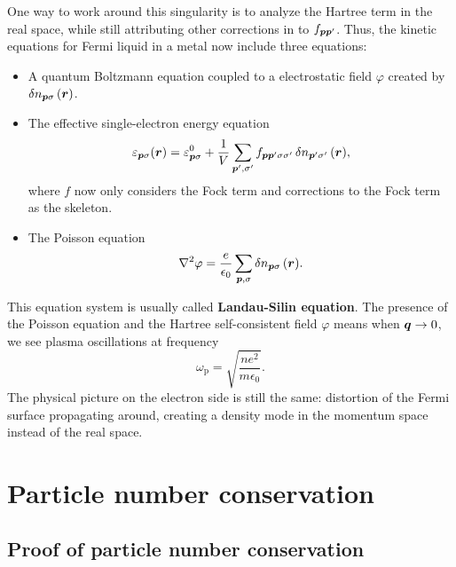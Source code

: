 \documentclass[hyperref, a4paper]{article}
\newcommand*{\concept}[1]{{\textbf{#1}}}
\begin{document}
One way to work around this singularity 
is to analyze the Hartree term in the real space, 
while still attributing other corrections in 
to $f_{\vb*{p} \vb*{p}'}$.
Thus, the kinetic equations for Fermi liquid in a metal 
now include three equations: 
\begin{itemize}
    \item A quantum Boltzmann equation coupled to a electrostatic field $\varphi$
    created by $\var{n}_{\vb*{p} \sigma}(\vb*{r})$.
    \item The effective single-electron energy equation 
    \begin{equation}
        \varepsilon_{\vb*{p} \sigma}(\vb*{r}) = \varepsilon^0_{\vb*{p} \sigma} 
        + \frac{1}{V} \sum_{\vb*{p}', \sigma'} 
        f_{\vb*{p} \vb*{p}' \sigma \sigma'} \var{n}_{\vb*{p}' \sigma'}(\vb*{r}),
    \end{equation}
    where $f$ now only considers the Fock term 
    and corrections to the Fock term as the skeleton.
    \item The Poisson equation 
    \begin{equation}
        \laplacian \varphi = \frac{e}{\epsilon_0} \sum_{\vb*{p}, \sigma} \var{n}_{\vb*{p} \sigma}(\vb*{r}).
    \end{equation}
\end{itemize}
This equation system is usually called \concept{Landau-Silin equation}.
The presence of the Poisson equation 
and the Hartree self-consistent field $\varphi$
means when $\vb*{q} \to 0$, 
we see plasma oscillations at frequency 
\begin{equation}
    \omega_{\text{p}} = \sqrt{\frac{n e^2}{m \epsilon_0}}.
\end{equation}
The physical picture on the electron side 
is still the same: 
distortion of the Fermi surface propagating around,
creating a density mode in the momentum space instead of the real space.

\section{Particle number conservation}

\subsection{Proof of particle number conservation}
\end{document}
